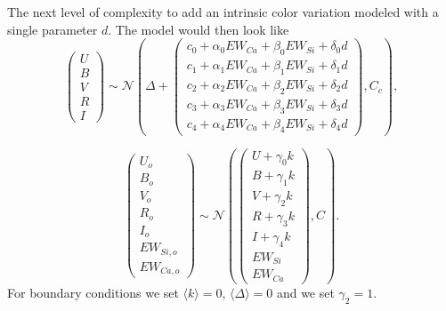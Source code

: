 \documentclass[11pt, oneside]{article}   	%
\begin{document}
The next level of complexity to add an intrinsic color variation modeled with a single parameter $d$.  The model would then look like
\begin{equation*}
\left(
\begin{matrix}
U\\B\\V\\R\\I
\end{matrix}
\right) \sim \mathcal{N}
\left(
\Delta +
\left(
\begin{matrix}
c_0+\alpha_0 EW_{Ca} + \beta_0 EW_{Si} + \delta_0 d \\
c_1+\alpha_1 EW_{Ca} + \beta_1 EW_{Si} + \delta_1 d\\
c_2+\alpha_2 EW_{Ca} + \beta_2 EW_{Si} + \delta_2 d\\
c_3+\alpha_3 EW_{Ca} + \beta_3 EW_{Si} + \delta_3 d\\
c_4+\alpha_4 EW_{Ca} + \beta_4 EW_{Si} + \delta_4 d
\end{matrix}
\right)
,C_{c}
\right),
\end{equation*}

\begin{equation*}
\left(
\begin{matrix}
U_o\\B_o\\ V_o\\R_o\\I_o\\EW_{Si, o}\\ EW_{Ca, o}
\end{matrix}
\right) \sim \mathcal{N}
\left(
\left(
\begin{matrix}
U +\gamma_0 k \\B +\gamma_1 k \\V+\gamma_2 k\\R+\gamma_3 k\\I+\gamma_4 k\\
EW_{Si}\\ EW_{Ca}
\end{matrix}
\right)
,C
\right).
\end{equation*}
For boundary conditions we set  $\langle k \rangle=0$,  $\langle \Delta \rangle=0$ and we set $\gamma_2=1$.
\end{document}
